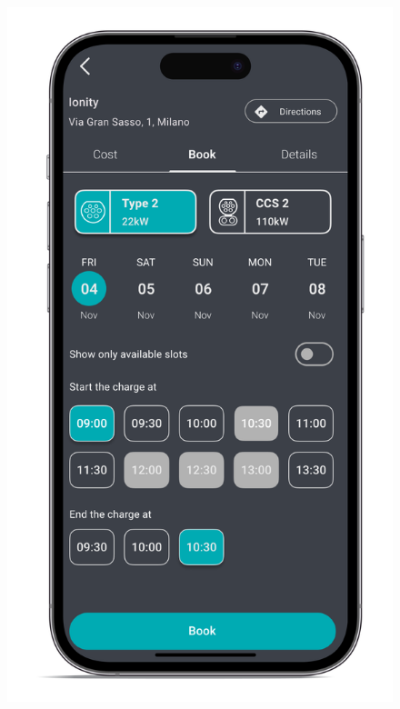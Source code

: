 \begin{figure}[H]
    \centering
    \includegraphics[scale=0.1]{src/mockups/book.png}
\end{figure} \vspace{1cm}
